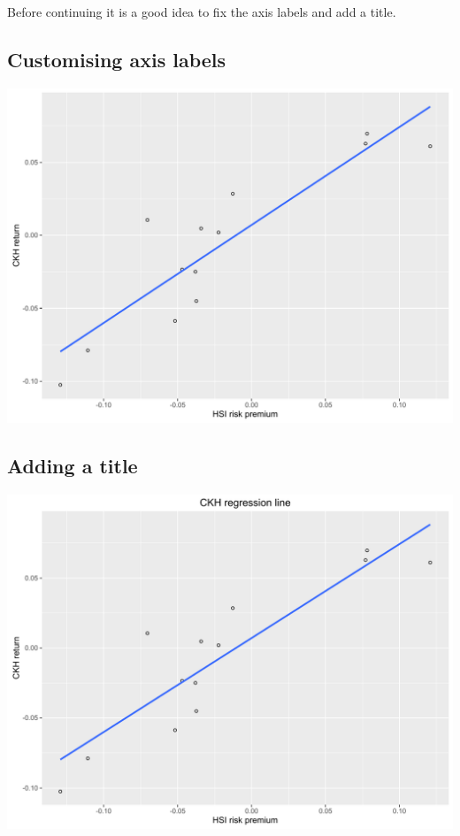 Before continuing it is a good idea to fix the axis labels and add a
title.

\subsection{Customising axis labels}\label{customising-axis-labels-4}

\begin{Shaded}
\begin{Highlighting}[]
\StringTok{ }\StringTok{ }\NormalTok{(} \NormalTok{) +}\StringTok{ }
\StringTok{       }\NormalTok{(} \NormalTok{)}
\end{Highlighting}
\end{Shaded}

\begin{center}\includegraphics[width=0.55\linewidth]{figures/lr_8-1} \end{center}

\subsection{Adding a title}\label{adding-a-title-4}

\begin{Shaded}
\begin{Highlighting}[]
\StringTok{ }\StringTok{ }\NormalTok{(}\NormalTok{)}
\end{Highlighting}
\end{Shaded}

\begin{center}\includegraphics[width=0.55\linewidth]{figures/lr_9-1} \end{center}


